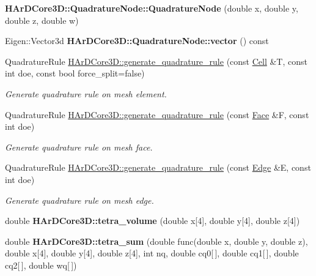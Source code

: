 \begin{DoxyCompactItemize}
\item 
\mbox{\label{group__Quadratures_ga7a185c689ce9f635e803694bd0e8d2e7}} 
{\bfseries H\+Ar\+D\+Core3\+D\+::\+Quadrature\+Node\+::\+Quadrature\+Node} (double x, double y, double z, double w)
\item 
\mbox{\label{group__Quadratures_gac0d94c3725c0502056333f314fb48fc9}} 
Eigen\+::\+Vector3d {\bfseries H\+Ar\+D\+Core3\+D\+::\+Quadrature\+Node\+::vector} () const
\item 
Quadrature\+Rule \hyperlink{group__Quadratures_ga18d0a2cf574bef7d6e83760de2f38152}{H\+Ar\+D\+Core3\+D\+::generate\+\_\+quadrature\+\_\+rule} (const \hyperlink{classHArDCore3D_1_1Cell}{Cell} \&T, const int doe, const bool force\+\_\+split=false)
\begin{DoxyCompactList}\small\item\em Generate quadrature rule on mesh element. \end{DoxyCompactList}\item 
Quadrature\+Rule \hyperlink{group__Quadratures_gae0e89136814758912e6e93fa0a260bd6}{H\+Ar\+D\+Core3\+D\+::generate\+\_\+quadrature\+\_\+rule} (const \hyperlink{classHArDCore3D_1_1Face}{Face} \&F, const int doe)
\begin{DoxyCompactList}\small\item\em Generate quadrature rule on mesh face. \end{DoxyCompactList}\item 
Quadrature\+Rule \hyperlink{group__Quadratures_ga1516d2ddf96226cbcbacf93675e6678f}{H\+Ar\+D\+Core3\+D\+::generate\+\_\+quadrature\+\_\+rule} (const \hyperlink{classHArDCore3D_1_1Edge}{Edge} \&E, const int doe)
\begin{DoxyCompactList}\small\item\em Generate quadrature rule on mesh edge. \end{DoxyCompactList}\item 
\mbox{\label{group__Quadratures_ga721ceca09ec55725a59f484412041546}} 
double {\bfseries H\+Ar\+D\+Core3\+D\+::tetra\+\_\+volume} (double x\mbox{[}4\mbox{]}, double y\mbox{[}4\mbox{]}, double z\mbox{[}4\mbox{]})
\item 
\mbox{\label{group__Quadratures_ga3d29f4e825b8ce8abed864fe61c1e547}} 
double {\bfseries H\+Ar\+D\+Core3\+D\+::tetra\+\_\+sum} (double func(double x, double y, double z), double x\mbox{[}4\mbox{]}, double y\mbox{[}4\mbox{]}, double z\mbox{[}4\mbox{]}, int nq, double cq0\mbox{[}$\,$\mbox{]}, double cq1\mbox{[}$\,$\mbox{]}, double cq2\mbox{[}$\,$\mbox{]}, double wq\mbox{[}$\,$\mbox{]})

\end{DoxyCompactItemize}
